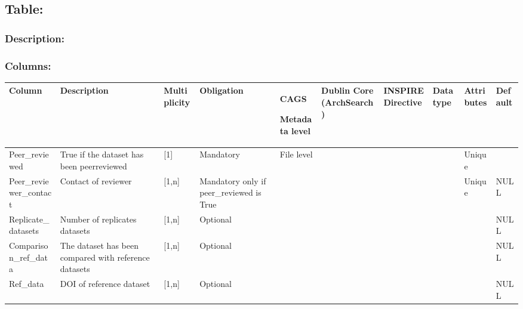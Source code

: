 \documentclass[letterpaper,10pt,english]{sphinxmanual}
\begin{document}
\subsection{Table: }
\label{\detokenize{schema_documentation:table-data-quality-assessment-metadata}}

\subsubsection{Description:}
\label{\detokenize{schema_documentation:description-4}}\label{\detokenize{schema_documentation:id24}}

\subsubsection{Columns:}
\label{\detokenize{schema_documentation:columns-5}}\label{\detokenize{schema_documentation:id25}}

\begin{savenotes}\sphinxattablestart
\centering
\begin{tabulary}{\linewidth}[t]{|T|T|T|T|T|T|T|T|T|T|}
\hline
\sphinxstyletheadfamily 
Column
&\sphinxstyletheadfamily 
Description
&\sphinxstyletheadfamily 
Multiplicity
&\sphinxstyletheadfamily 
Obligation
&\sphinxstyletheadfamily 
CAGS

Metadata level
&\sphinxstyletheadfamily 
Dublin Core (ArchSearch)
&\sphinxstyletheadfamily 
INSPIRE Directive
&\sphinxstyletheadfamily 
Data type
&\sphinxstyletheadfamily 
Attributes
&\sphinxstyletheadfamily 
Default
\\
\hline
Peer\_reviewed
&
True if the dataset has been   peer\sphinxhyphen{}reviewed
&
{[}1{]}
&
Mandatory
&
File level
&&&&
Unique
&\\
\hline
Peer\_reviewer\_contact
&
Contact of reviewer
&
{[}1,n{]}
&
Mandatory only if peer\_reviewed is True
&&&&&
Unique
&
NULL
\\
\hline
Replicate\_datasets
&
Number of replicates datasets
&
{[}1,n{]}
&
Optional
&&&&&&
NULL
\\
\hline
Comparison\_ref\_data
&
The dataset has been compared with   reference datasets
&
{[}1,n{]}
&
Optional
&&&&&&
NULL
\\
\hline
Ref\_data
&
DOI of reference dataset
&
{[}1,n{]}
&
Optional
&&&&&&
NULL
\\
\hline
\end{tabulary}
\par
\sphinxattableend\end{savenotes}
\end{document}
